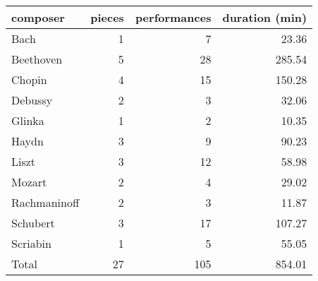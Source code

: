 \begin{tabular}{lrrr}
\toprule
composer & pieces & performances & duration (min) \\
\midrule
Bach & 1 & 7 & 23.36 \\
Beethoven & 5 & 28 & 285.54 \\
Chopin & 4 & 15 & 150.28 \\
Debussy & 2 & 3 & 32.06 \\
Glinka & 1 & 2 & 10.35 \\
Haydn & 3 & 9 & 90.23 \\
Liszt & 3 & 12 & 58.98 \\
Mozart & 2 & 4 & 29.02 \\
Rachmaninoff & 2 & 3 & 11.87 \\
Schubert & 3 & 17 & 107.27 \\
Scriabin & 1 & 5 & 55.05 \\
Total & 27 & 105 & 854.01 \\
\bottomrule
\end{tabular}
